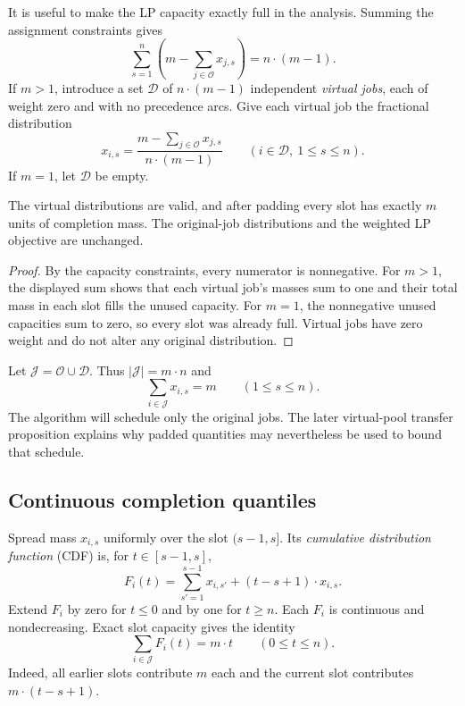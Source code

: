 It is useful to make the LP capacity exactly full in the analysis.
Summing the assignment constraints gives
\[
 \sum_{s=1}^n\left(m-\sum_{j\in\mathcal O}x_{j,s}\right)=n\cdot(m-1).
\]
If $m>1$, introduce a set $\mathcal D$ of $n\cdot(m-1)$ independent
\emph{virtual jobs}, each of weight zero and with no precedence arcs.
Give each virtual job the fractional distribution
\[
 x_{i,s}=\frac{m-\sum_{j\in\mathcal O}x_{j,s}}{n\cdot(m-1)}
 \qquad(i\in\mathcal D,\ 1\le s\le n).
\]
If $m=1$, let $\mathcal D$ be empty.

\begin{lemma}
The virtual distributions are valid, and after padding every slot has
exactly $m$ units of completion mass. The original-job distributions and the
weighted LP objective are unchanged.
\end{lemma}
\begin{proof}
By the capacity constraints, every numerator is nonnegative. For $m>1$,
the displayed sum shows that each virtual job's masses sum to one and
their total mass in each slot fills the unused capacity. For $m=1$, the
nonnegative unused capacities sum to zero, so every slot was already full.
Virtual jobs have zero weight and do not alter any original distribution.
\end{proof}

Let $\mathcal J=\mathcal O\cup\mathcal D$. Thus
$|\mathcal J|=m\cdot n$ and
\[
 \sum_{i\in\mathcal J}x_{i,s}=m\qquad(1\le s\le n).
\]
The algorithm will schedule only the original jobs. The later
virtual-pool transfer proposition explains why padded quantities may
nevertheless be used to bound that schedule.

\subsection{Continuous completion quantiles}
\label{sec:foundations-interpolation}

Spread mass $x_{i,s}$ uniformly over the slot $(s-1,s]$. Its \emph{cumulative distribution function} (CDF) is, for $t\in[s-1,s]$,
\[
 F_i(t)=\sum_{s'=1}^{s-1}x_{i,s'}+(t-s+1)\cdot x_{i,s}.
\]
Extend $F_i$ by zero for $t\le0$ and by one for $t\ge n$. Each $F_i$ is
continuous and nondecreasing. Exact slot capacity gives the identity
\begin{equation}
 \sum_{i\in\mathcal J}F_i(t)=m\cdot t\qquad(0\le t\le n).
 \label{eq:foundations-continuous-capacity}
\end{equation}
Indeed, all earlier slots contribute $m$ each and the current slot
contributes $m\cdot(t-s+1)$.

